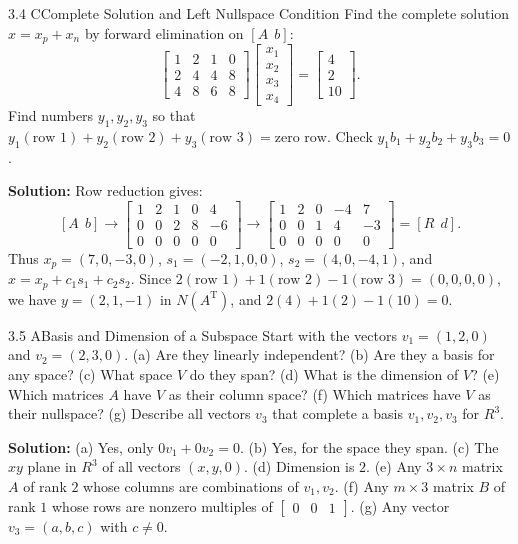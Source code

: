 \documentclass[11pt,a4paper,openany,oneside]{book}
\def\vect#1{#1}%
\def\mathbf#1{#1}%
\newcommand{\vect}[1]{\mathbf{#1}}
\newcommand{\T}{\mathrm{T}}
\numberwithin{equation}{chapter}
\begin{document}
\begin{example}{3.4 C}{Complete Solution and Left Nullspace Condition}
Find the complete solution $\vect{x} = \vect{x}_p + \vect{x}_n$ by forward elimination on $[A \ \ \vect{b}]$:
\[
\begin{bmatrix} 1 & 2 & 1 & 0 \\ 2 & 4 & 4 & 8 \\ 4 & 8 & 6 & 8 \end{bmatrix} \begin{bmatrix} x_1 \\ x_2 \\ x_3 \\ x_4 \end{bmatrix} = \begin{bmatrix} 4 \\ 2 \\ 10 \end{bmatrix}.
\]
Find numbers $y_1, y_2, y_3$ so that $y_1(\text{row 1}) + y_2(\text{row 2}) + y_3(\text{row 3}) = \text{zero row}$. Check $y_1b_1 + y_2b_2 + y_3b_3 = 0$.
\end{example}
\textbf{Solution:} Row reduction gives:
\[
[A \ \ \vect{b}] \to \begin{bmatrix} 1 & 2 & 1 & 0 & 4 \\ 0 & 0 & 2 & 8 & -6 \\ 0 & 0 & 0 & 0 & 0 \end{bmatrix} \to \begin{bmatrix} 1 & 2 & 0 & -4 & 7 \\ 0 & 0 & 1 & 4 & -3 \\ 0 & 0 & 0 & 0 & 0 \end{bmatrix} = [R \ \ \vect{d}].
\]
Thus $\vect{x}_p = (7,0,-3,0)$, $\vect{s}_1 = (-2,1,0,0)$, $\vect{s}_2 = (4,0,-4,1)$, and $\vect{x} = \vect{x}_p + c_1\vect{s}_1 + c_2\vect{s}_2$.
Since $2(\text{row 1}) + 1(\text{row 2}) - 1(\text{row 3}) = (0,0,0,0)$, we have $\vect{y} = (2,1,-1)$ in $N(A^\T)$, and $2(4) + 1(2) - 1(10) = 0$.

\begin{example}{3.5 A}{Basis and Dimension of a Subspace}
Start with the vectors $\vect{v}_1 = (1, 2, 0)$ and $\vect{v}_2 = (2, 3, 0)$. (a) Are they linearly independent? (b) Are they a basis for any space? (c) What space $\mathbf{V}$ do they span? (d) What is the dimension of $\mathbf{V}$? (e) Which matrices $A$ have $\mathbf{V}$ as their column space? (f) Which matrices have $\mathbf{V}$ as their nullspace? (g) Describe all vectors $\vect{v}_3$ that complete a basis $\vect{v}_1, \vect{v}_2, \vect{v}_3$ for $\mathbf{R}^3$.
\end{example}
\textbf{Solution:} (a) Yes, only $0\vect{v}_1 + 0\vect{v}_2 = \vect{0}$. (b) Yes, for the space they span. (c) The $xy$ plane in $\mathbf{R}^3$ of all vectors $(x,y,0)$. (d) Dimension is $2$. (e) Any $3\times n$ matrix $A$ of rank $2$ whose columns are combinations of $\vect{v}_1, \vect{v}_2$. (f) Any $m\times 3$ matrix $B$ of rank $1$ whose rows are nonzero multiples of $\begin{bmatrix}0 & 0 & 1\end{bmatrix}$. (g) Any vector $\vect{v}_3 = (a,b,c)$ with $c \neq 0$.
\end{document}

